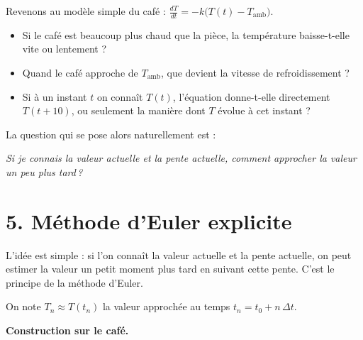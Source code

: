 \medskip

Revenons au modèle simple du café :
$\displaystyle\frac{dT}{dt}
= -k\bigl(T(t) - T_{\mathrm{amb}}\bigr).$

\begin{itemize}[leftmargin=*]
  \item Si le café est beaucoup plus chaud que la pièce,
        la température baisse-t-elle vite ou lentement ?
  \item Quand le café approche de $T_{\mathrm{amb}}$,
        que devient la vitesse de refroidissement ?
  \item Si à un instant $t$ on connaît $T(t)$,
        l'équation donne-t-elle directement $T(t+10)$,
        ou seulement la manière dont $T$ évolue à cet instant ?
\end{itemize}


La question qui se pose alors naturellement est :

\begin{center}
\begin{mdframed}[backgroundcolor=ThemeLight, linecolor=Theme,
  linewidth=1pt, innertopmargin=8pt, innerbottommargin=8pt]
\centering\itshape
\og Si je connais la valeur actuelle et la pente actuelle,
comment approcher la valeur un peu plus tard\,?\fg{}
\end{mdframed}
\end{center}

\section*{5. Méthode d'Euler explicite}

L'idée est simple : si l'on connaît la valeur actuelle
et la pente actuelle, on peut estimer la valeur
un petit moment plus tard en suivant cette pente.
C'est le principe de la méthode d'Euler.

\medskip

On note $T_n \approx T(t_n)$ la valeur approchée au temps
$t_n = t_0 + n\,\Delta t$.

\medskip

\textbf{Construction sur le café.}

